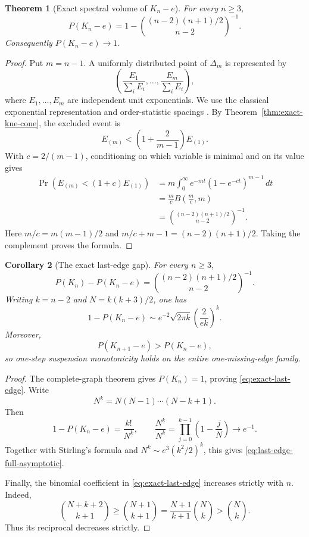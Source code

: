 \documentclass[11pt,reqno]{amsart}
\newtheorem{theorem}{Theorem}[section]
\newtheorem{corollary}[theorem]{Corollary}
\theoremstyle{definition}
\theoremstyle{remark}
\begin{document}
\begin{theorem}[Exact spectral volume of $K_n-e$]
\label{thm:volume-bound}
For every $n\ge3$,
\begin{equation}\label{eq:volume-bound}
  P(K_n-e)
  =1-\binom{(n-2)(n+1)/2}{n-2}^{-1}.
\end{equation}
Consequently $P(K_n-e)\to1$.
\end{theorem}

\begin{proof}
Put $m=n-1$.  A uniformly distributed point of $\Delta_m$ is represented by
\[
  \left(\frac{E_1}{\sum_iE_i},\ldots,
  \frac{E_m}{\sum_iE_i}\right),
\]
where $E_1,\ldots,E_m$ are independent unit exponentials.  We use the
classical exponential representation and order-statistic spacings
\cite{Renyi1953}.  By Theorem~\ref{thm:exact-kne-cone}, the excluded event is
\[
  E_{(m)}<\left(1+\frac{2}{m-1}\right)E_{(1)}.
\]
With $c=2/(m-1)$, conditioning on which variable is minimal and on its value
gives
\begin{align*}
  \Pr(E_{(m)}<(1+c)E_{(1)})
  &=m\int_0^\infty e^{-mt}(1-e^{-ct})^{m-1}\,dt\\
  &=\frac{m}{c}B\left(\frac{m}{c},m\right)\\
  &=\binom{(n-2)(n+1)/2}{n-2}^{-1}.
\end{align*}
Here $m/c=m(m-1)/2$ and
$m/c+m-1=(n-2)(n+1)/2$.  
Taking the complement proves the formula.
\end{proof}

\begin{corollary}[The exact last-edge gap]\label{cor:last-edge}
For every $n\ge3$,
\begin{equation}\label{eq:exact-last-edge}
  P(K_n)-P(K_n-e)
  =\binom{(n-2)(n+1)/2}{n-2}^{-1}.
\end{equation}
Writing $k=n-2$ and $N=k(k+3)/2$, one has
\begin{equation}\label{eq:last-edge-full-asymptotic}
  1-P(K_n-e)
  \sim e^{-2}\sqrt{2\pi k}
  \left(\frac{2}{ek}\right)^k.
\end{equation}
Moreover,
\[
  P(K_{n+1}-e)>P(K_n-e),
\]
so one-step suspension monotonicity holds on the entire one-missing-edge
family.
\end{corollary}

\begin{proof}
The complete-graph theorem gives $P(K_n)=1$, proving
\eqref{eq:exact-last-edge}.  Write
\[
  N^{\underline{k}}=N(N-1)\cdots(N-k+1).
\]
Then
\[
  1-P(K_n-e)=\frac{k!}{N^{\underline{k}}},
  \qquad
  \frac{N^{\underline{k}}}{N^k}
  =\prod_{j=0}^{k-1}\left(1-\frac jN\right)\longrightarrow e^{-1}.
\]
Together with Stirling's formula and
$N^k\sim e^3(k^2/2)^k$, this gives
\eqref{eq:last-edge-full-asymptotic}.

Finally, the binomial coefficient in \eqref{eq:exact-last-edge} increases
strictly with $n$.  Indeed,
\[
  \binom{N+k+2}{k+1}
  \ge\binom{N+1}{k+1}
  =\frac{N+1}{k+1}\binom Nk
  >\binom Nk.
\]
Thus its reciprocal decreases strictly.
\end{proof}
\end{document}

